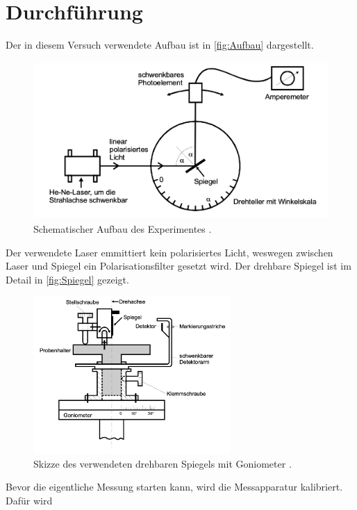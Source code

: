 \section{Durchführung}
\label{sec:Durchführung}
Der in diesem Versuch verwendete Aufbau ist in \autoref{fig:Aufbau} dargestellt.
\begin{figure}[H]
    \centering
    \includegraphics[height=6cm]{content/pics/Aufbau.png}
    \caption{Schematischer Aufbau des Experimentes \cite{v407}.}
    \label{fig:Aufbau}
\end{figure}
Der verwendete Laser emmittiert kein polarisiertes Licht, weswegen zwischen Laser und
Spiegel ein Polarisationsfilter gesetzt wird. Der drehbare Spiegel ist im Detail in 
\autoref{fig:Spiegel} gezeigt.
\begin{figure}[H]
    \centering
    \includegraphics[height=6cm]{content/pics/Goniometer.png}
    \caption{Skizze des verwendeten drehbaren Spiegels mit Goniometer \cite{v407}.}
    \label{fig:Spiegel}
\end{figure}

Bevor die eigentliche Messung starten kann, wird die Messapparatur kalibriert.
Dafür wird
